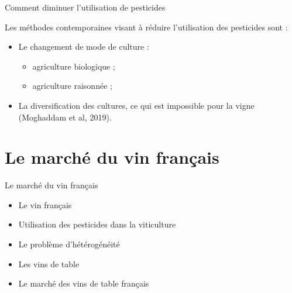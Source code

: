 \documentclass[11pt,ignorenonframetext,]{beamer}
\providecommand{\tightlist}{%
  \setlength{\itemsep}{0pt}\setlength{\parskip}{0pt}}
\begin{document}
\begin{frame}{Comment diminuer l'utilisation de pesticides}
\protect\hypertarget{comment-diminuer-lutilisation-de-pesticides}{}

Les méthodes contemporaines visant à réduire l'utilisation des
pesticides sont :

\begin{itemize}
\tightlist
\item
  Le changement de mode de culture :

  \begin{itemize}
  \tightlist
  \item
    agriculture biologique ;
  \item
    agriculture raisonnée ;
  \end{itemize}
\item
  La diversification des cultures, ce qui est impossible pour la vigne
  (Moghaddam et al, 2019).
\end{itemize}

\end{frame}

\hypertarget{le-marche-du-vin-francais}{%
\section{Le marché du vin français}\label{le-marche-du-vin-francais}}

\begin{frame}{Le marché du vin français}
\protect\hypertarget{le-marche-du-vin-francais-1}{}

\begin{itemize}
\tightlist
\item
  Le vin français
\item
  Utilisation des pesticides dans la viticulture
\item
  Le problème d'hétérogénéité
\item
  Les vins de table
\item
  Le marché des vins de table français
\end{itemize}

\end{frame}
\end{document}
